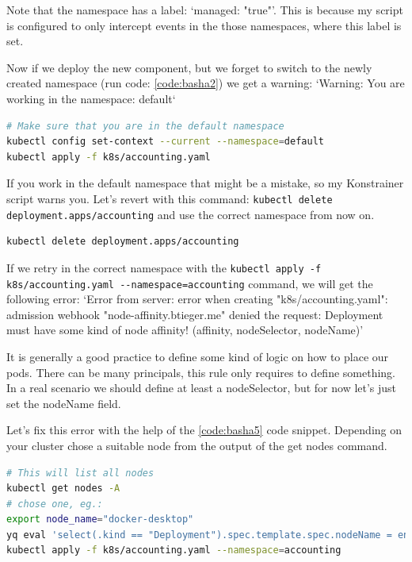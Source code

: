 Note that the namespace has a label: `managed: "true"'. This is because my script is configured to only intercept events in the those namespaces, where this label is set.

Now if we deploy the new component, but we forget to switch to the newly created namespace (run code: \ref{code:basha2}) we get a warning: `Warning: You are working in the namespace: default`

\begin{lstlisting}[caption={Deploy the Accounting module},language=bash,label=code:basha2]
# Make sure that you are in the default namespace
kubectl config set-context --current --namespace=default
kubectl apply -f k8s/accounting.yaml
\end{lstlisting}

If you work in the default namespace that might be a mistake, so my Konstrainer script warns you. Let's revert with this command: \lstinline|kubectl delete deployment.apps/accounting| and use the correct namespace from now on.

\begin{lstlisting}[caption={Delete Accounting module from the default namespace},language=bash,label=code:basha3]
kubectl delete deployment.apps/accounting

\end{lstlisting}

If we retry in the correct namespace with the \lstinline|kubectl apply -f k8s/accounting.yaml --namespace=accounting| command, we will get the following error: `Error from server: error when creating "k8s/accounting.yaml": admission webhook "node-affinity.btieger.me" denied the request: Deployment must have some kind of node affinity! (affinity, nodeSelector, nodeName)'

It is generally a good practice to define some kind of logic on how to place our pods. There can be many principals, this rule only requires to define something. In a real scenario we should define at least a nodeSelector, but for now let's just set the nodeName field.

Let's fix this error with the help of the \ref{code:basha5} code snippet. Depending on your cluster chose a suitable node from the output of the get nodes command.

\begin{lstlisting}[caption={Fix node affinity error},language=bash,label=code:basha5]
# This will list all nodes
kubectl get nodes -A
# chose one, eg.:
export node_name="docker-desktop"
yq eval 'select(.kind == "Deployment").spec.template.spec.nodeName = env(node_name)' k8s/accounting.yaml -i
kubectl apply -f k8s/accounting.yaml --namespace=accounting
\end{lstlisting}

